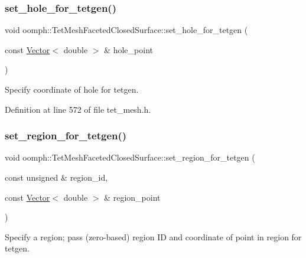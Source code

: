 \subsubsection{\texorpdfstring{set\+\_\+hole\+\_\+for\+\_\+tetgen()}{set\_hole\_for\_tetgen()}}
{\footnotesize\ttfamily void oomph\+::\+Tet\+Mesh\+Faceted\+Closed\+Surface\+::set\+\_\+hole\+\_\+for\+\_\+tetgen (\begin{DoxyParamCaption}\item[{const \hyperlink{classoomph_1_1Vector}{Vector}$<$ double $>$ \&}]{hole\+\_\+point }\end{DoxyParamCaption})\hspace{0.3cm}{\ttfamily [inline]}}



Specify coordinate of hole for tetgen. 



Definition at line 572 of file tet\+\_\+mesh.\+h.

\mbox{\label{classoomph_1_1TetMeshFacetedClosedSurface_ac60fa3591df9cdcfc07521410e986130}} 
\subsubsection{\texorpdfstring{set\+\_\+region\+\_\+for\+\_\+tetgen()}{set\_region\_for\_tetgen()}}
{\footnotesize\ttfamily void oomph\+::\+Tet\+Mesh\+Faceted\+Closed\+Surface\+::set\+\_\+region\+\_\+for\+\_\+tetgen (\begin{DoxyParamCaption}\item[{const unsigned \&}]{region\+\_\+id,  }\item[{const \hyperlink{classoomph_1_1Vector}{Vector}$<$ double $>$ \&}]{region\+\_\+point }\end{DoxyParamCaption})\hspace{0.3cm}{\ttfamily [inline]}}



Specify a region; pass (zero-\/based) region ID and coordinate of point in region for tetgen. 



